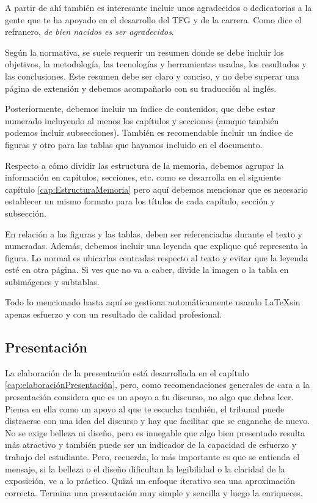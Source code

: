 {A partir de ahí también es interesante incluir unos agradecidos o dedicatorias a la gente que te ha apoyado en el desarrollo del TFG y de la carrera. Como dice el refranero, {\it de bien nacidos es ser agradecidos}.

Según la normativa, se suele requerir un resumen donde se debe incluir los objetivos, la metodología, las tecnologías y herramientas usadas, los resultados y las conclusiones. Este resumen debe ser claro y conciso, y no debe superar una página de extensión y debemos acompañarlo con su traducción al inglés.

Posteriormente, debemos incluir un índice de contenidos, que debe estar numerado incluyendo al menos los capítulos y secciones (aunque también podemos incluir subsecciones). También es recomendable incluir un índice de figuras y otro para las tablas que hayamos incluido en el documento.

Respecto a cómo dividir las estructura de la memoria, debemos agrupar la información en capítulos, secciones, etc. como se desarrolla en el siguiente capítulo \ref{cap:EstructuraMemoria} pero aquí debemos mencionar que es necesario establecer un mismo formato para los títulos de cada capítulo, sección y subsección.

En relación a las figuras y las tablas, deben ser referenciadas durante el texto y numeradas. Además, debemos incluir una leyenda que explique qué representa la figura. Lo normal es ubicarlas centradas respecto al texto y evitar que la leyenda esté en otra página. Si ves que no va a caber, divide la imagen o la tabla en subimágenes y subtablas.

Todo lo mencionado hasta aquí se gestiona automáticamente usando \LaTeX sin apenas esfuerzo y con un resultado de calidad profesional.

\subsection{Presentación}

La elaboración de la presentación está desarrollada en el capítulo \ref{cap:elaboraciónPresentación}, pero, como recomendaciones generales de cara a la presentación considera que es un apoyo a tu discurso, no algo que debas leer. Piensa en ella como un apoyo al que te escucha también, el tribunal puede distraerse con una idea del discurso y hay que facilitar que se enganche de nuevo. No se exige belleza ni diseño, pero es innegable que algo bien presentado resulta más atractivo y también puede ser un indicador de la capacidad de esfuerzo y trabajo del estudiante. Pero, recuerda, lo más importante es que se entienda el mensaje, si la belleza o el diseño dificultan la legibilidad o la claridad de la exposición, ve a lo práctico. Quizá un enfoque iterativo sea una aproximación correcta. Termina una presentación muy simple y sencilla y luego la enriqueces.

}
